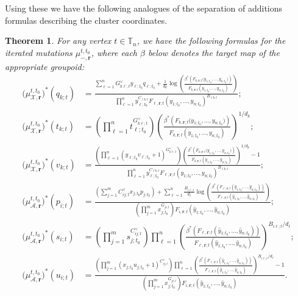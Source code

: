 \documentclass{amsart}
\newtheorem{theorem}{Theorem}[section]
\numberwithin{equation}{section}
\newcommand{\bfr}{{\boldsymbol{r}}}
\newcommand{\cA}{\mathcal{A}}
\newcommand{\cX}{\mathcal{X}}
\newcommand{\TT}{\mathbb{T}}
\begin{document}
Using these we have the following analogues of the separation of additions formulas describing the cluster coordinates.
\begin{theorem}
  \label{th:groupoid separation of additions}
  For any vertex $t\in\TT_n$, we have the following formulas for the iterated mutations $\mu_{-,\bfr}^{t,t_0}$, where each $\beta$ below denotes the target map of the appropriate groupoid:
  \begin{align}
    \nonumber \big(\mu_{\cX,\bfr}^{t,t_0}\big)^*(q_{k;t})&=\frac{ \sum_{\ell=1}^n G^\vee_{k\ell;t} y_{\ell;t_0} q_{\ell;t_0} +\frac{1}{d_k} \log\left(\frac{\beta^*\left(F_{k,\bfr;t}\big(y_{1;t_0},\ldots,y_{n;t_0}\big)\right)}{F_{k,\bfr;t}(y_{1;t_0},\ldots,y_{n;t_0})}\right)}{\prod_{\ell=1}^n y_{\ell;t_0}^{C_{\ell k;t}} F_{\ell,\bfr;t}(y_{1;t_0},\ldots,y_{n;t_0})^{B_{\ell k;t}}};\\
    \nonumber \big(\mu_{\cX,\bfr}^{t,t_0}\big)^*(t_{k;t})&=\left(\prod_{\ell=1}^n t_{\ell;t_0}^{G^\vee_{k\ell;t}}\right) \left(\frac{\beta^*\left(F_{k,\bfr;t}\big(y_{1;t_0},\ldots,y_{n;t_0}\big)\right)}{F_{k,\bfr;t}(y_{1;t_0},\ldots,y_{n;t_0})}\right)^{1/d_k};\\
    \nonumber \big(\mu_{\cX,\bfr}^{t,t_0}\big)^*(v_{k;t})&=\frac{\left(\prod_{\ell=1}^n (y_{\ell;t_0} v_{\ell;t_0} + 1)^{G^\vee_{k\ell;t}}\right) \left(\frac{\beta^*\left(F_{k,\bfr;t}\big(y_{1;t_0},\ldots,y_{n;t_0}\big)\right)}{F_{k,\bfr;t}(y_{1;t_0},\ldots,y_{n;t_0})}\right)^{1/d_k} - 1}{\prod_{\ell=1}^n y_{\ell;t_0}^{C_{\ell k;t}} F_{\ell,\bfr;t}(y_{1;t_0},\ldots,y_{n;t_0})^{B_{\ell k;t}}};\\
    \nonumber \big(\mu_{\cA,\bfr}^{t,t_0}\big)^*(p_{i;t})&=\frac{\left(\sum_{j=1}^m C^\vee_{ij;t} x_{j;t_0} p_{j;t_0}\right) + \sum_{\ell=1}^n \frac{B_{i\ell;t}}{d_\ell}\log\left(\frac{\beta^*\left(F_{\ell,\bfr;t}(\hat y_{1;t_0},\ldots,\hat y_{n;t_0})\right)}{F_{\ell,\bfr;t}(\hat y_{1;t_0},\ldots,\hat y_{n;t_0})}\right)}{\left(\prod_{j=1}^m x_{j;t_0}^{G_{ji;t}}\right) F_{i,\bfr;t}(\hat y_{1;t_0},\ldots,\hat y_{n;t_0})};\\
    \label{eq:groupoid separation of additions 2}
    \big(\mu_{\cA,\bfr}^{t,t_0}\big)^*(s_{i;t})&=\left(\prod_{j=1}^m s_{j;t_0}^{C^\vee_{ij;t}}\right) \prod_{\ell=1}^n \left(\frac{\beta^*\left(F_{\ell,\bfr;t}(\hat y_{1;t_0},\ldots,\hat y_{n;t_0})\right)}{F_{\ell,\bfr;t}(\hat y_{1;t_0},\ldots,\hat y_{n;t_0})}\right)^{B_{i\ell;t}/d_\ell};\\
    \nonumber \big(\mu_{\cA,\bfr}^{t,t_0}\big)^*(u_{i;t})&=\frac{\left(\prod_{j=1}^m (x_{j;t_0} u_{j;t_0} + 1)^{C^\vee_{ij;t}}\right) \prod_{\ell=1}^n \left(\frac{\beta^*\left(F_{\ell,\bfr;t}(\hat y_{1;t_0},\ldots,\hat y_{n;t_0})\right)}{F_{\ell,\bfr;t}(\hat y_{1;t_0},\ldots,\hat y_{n;t_0})}\right)^{B_{i\ell;t}/d_\ell} - 1}{\left(\prod_{j=1}^m x_{j;t_0}^{G_{ji;t}}\right) F_{i,\bfr;t}(\hat y_{1;t_0},\ldots,\hat y_{n;t_0})}.
  \end{align}
\end{theorem}
\end{document}
